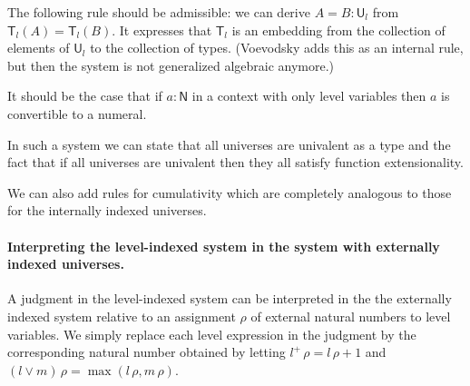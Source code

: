 \documentclass[11pt,a4paper]{article}
\def\NN{\mathsf{N}}
\def\UU{\mathsf{U}}
\newcommand{\T}{\mathsf{T}}
\begin{document}
The following rule should be admissible:
we can derive $A = B : \UU_l$ from $\T_l(A) = \T_l(B)$.
 It expresses that $\T_l$ is an embedding from the collection of elements of $\UU_l$
 to the collection of types.
 (Voevodsky \cite[Rule 20 on p. 17]{VV} adds this as an internal rule, but then the system is not
 generalized algebraic anymore.)

It should be the case that if $a :\NN$ in a context with only level variables
then $a$ is convertible to a numeral.

In such a system we can state that all universes are univalent as a type and the
fact that if all universes are univalent then they all satisfy function extensionality.

We can also add rules for cumulativity which are completely analogous to those for the internally indexed universes.

\paragraph{Interpreting the level-indexed system in the system with externally indexed universes.}

A judgment in the level-indexed system can be interpreted in the the externally indexed system relative to an assignment $\rho$ of external natural numbers to level variables. We simply replace each level expression in the judgment by the corresponding natural number obtained by letting $l^+\,\rho = l\,\rho+1$ and $(l \vee m)\,\rho = \max(l\,\rho,m\,\rho)$.

%
%
%
%
%
%
%
\end{document}
